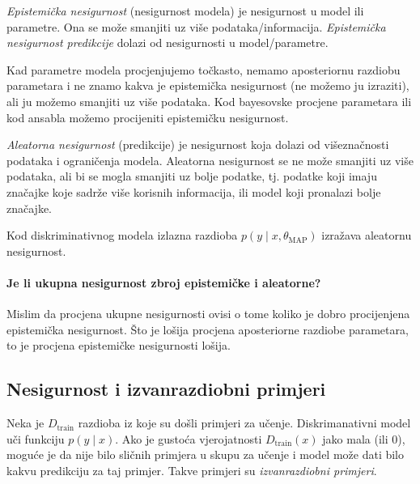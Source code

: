 \documentclass{article}
\begin{document}
\emph{Epistemička nesigurnost} (nesigurnost modela) je nesigurnost u model ili parametre. Ona se može smanjiti uz više podataka/informacija. \emph{Epistemička nesigurnost predikcije} dolazi od nesigurnosti u model/parametre.

Kad parametre modela procjenjujemo točkasto, nemamo aposteriornu razdiobu parametara i ne znamo kakva je epistemička nesigurnost (ne možemo ju izraziti), ali ju možemo smanjiti uz više podataka. Kod bayesovske procjene parametara ili kod ansabla možemo procijeniti epistemičku nesigurnost.

\emph{Aleatorna nesigurnost} (predikcije) je nesigurnost koja dolazi od višeznačnosti podataka i ograničenja modela. Aleatorna nesigurnost se ne može smanjiti uz više podataka, ali bi se mogla smanjiti uz bolje podatke, tj. podatke koji imaju značajke koje sadrže više korisnih informacija, ili model koji pronalazi bolje značajke.

Kod diskriminativnog modela izlazna razdioba $p(y\mid x, \theta_\text{MAP})$ izražava aleatornu nesigurnost.

\paragraph{Je li ukupna nesigurnost zbroj epistemičke i aleatorne?}
Mislim da procjena ukupne nesigurnosti ovisi o tome koliko je dobro procijenjena epistemička nesigurnost. Što je lošija procjena aposteriorne razdiobe parametara, to je procjena epistemičke nesigurnosti lošija.


\subsection{Nesigurnost i izvanrazdiobni primjeri}

Neka je $D_{\text{train}}$ razdioba iz koje su došli primjeri za učenje. Diskrimanativni model uči funkciju $p(y\mid x)$. Ako je gustoća vjerojatnosti $D_{\text{train}}(x)$ jako mala (ili $0$), moguće je da nije bilo sličnih primjera u skupu za učenje i model može dati bilo kakvu predikciju za taj primjer. Takve primjeri su \emph{izvanrazdiobni primjeri}.
\end{document}
